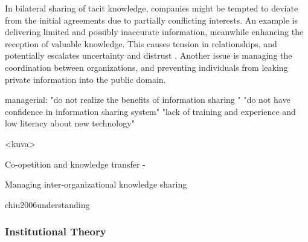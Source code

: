 In bilateral sharing of tacit knowledge, companies might be tempted to deviate from the initial agreements due to partially conflicting interests. An example is delivering limited and possibly inaccurate information, meanwhile enhancing the reception of valuable knowledge. This causes tension in relationships, and potentially escalates uncertainty and distrust \cite{hsu2014examining}. Another issue is managing the coordination between organizations, and preventing individuals from leaking private information into the public domain. 










managerial: 
"do not realize the benefits of information sharing "
"do not have confidence in information sharing system"
"lack of training and experience and low literacy about new technology"

<kuva>





Co-opetition and knowledge transfer %
-



Managing inter-organizational knowledge sharing



chiu2006understanding



\subsubsection{Institutional Theory}






